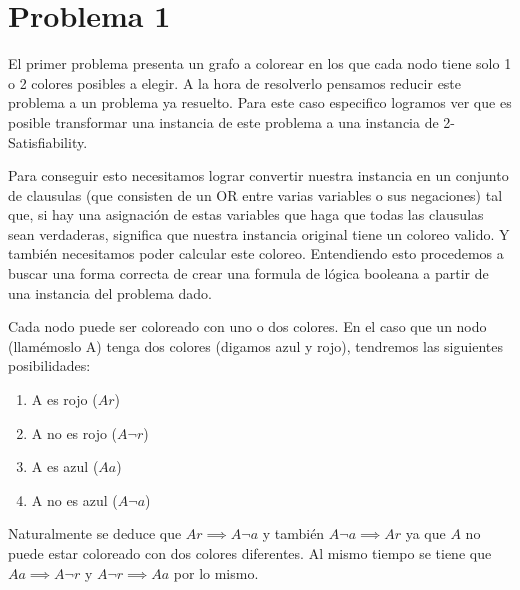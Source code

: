 \documentclass{article}
\theoremstyle{definition}
\theoremstyle{remark}
\begin{document}
{} %

\subtitulo{}
\grupo{}

 
\maketitle

\pagebreak

\tableofcontents

\pagebreak

\section{Problema 1}

El primer problema presenta un grafo a colorear en los que cada nodo tiene solo 1 o 2 colores posibles a elegir. A la hora de resolverlo pensamos reducir este problema a un problema ya resuelto. Para este caso especifico logramos ver que es posible transformar una instancia de este problema a una instancia de 2-Satisfiability.\par
Para conseguir esto necesitamos lograr convertir nuestra instancia en un conjunto de clausulas (que consisten de un OR entre varias variables o sus negaciones) tal que, si hay una asignación de estas variables que haga que todas las clausulas sean verdaderas, significa que nuestra instancia original tiene un coloreo valido. Y también necesitamos poder calcular este coloreo.\smallbreak
Entendiendo esto procedemos a buscar una forma correcta de crear una formula de lógica booleana a partir de una instancia del problema dado.\par
Cada nodo puede ser coloreado con uno o dos colores. 
En el caso que un nodo (llamémoslo A) tenga dos colores (digamos azul y rojo), tendremos las siguientes posibilidades:
\begin{enumerate}
\item A es rojo ($Ar$)
\item A no es rojo ($A\neg r$)
\item A es azul ($Aa$)
\item A no es azul ($A\neg a$)
\end{enumerate}
Naturalmente se deduce que $Ar \implies A\neg a$ y también $A\neg a \implies Ar$ ya que $A$ no puede estar coloreado con dos colores diferentes. Al mismo tiempo se tiene que $Aa \implies A\neg r$ y $A\neg r \implies Aa$ por lo mismo.
\end{document}
